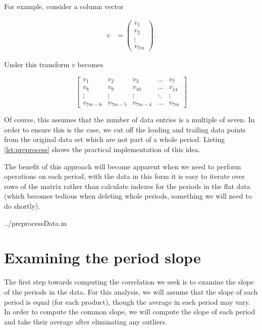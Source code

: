 For example, consider a column vector 

\begin{align}
   v &= \begin{pmatrix}
           v_{1} \\
           v_{2} \\
           \vdots \\
           v_{7m}
         \end{pmatrix}.
  \end{align}

Under this transform $v$ becomes

\[
\begin{bmatrix}
    v_{1} & v_{2} & v_{3} & \dots  & v_{7} \\
    v_{8} & v_{9} & v_{10} & \dots  & v_{14} \\
    \vdots & \vdots & \vdots & \ddots & \vdots \\
    v_{7m-6} & v_{7m-5} & v_{7m -4} & \dots  & v_{7m}
\end{bmatrix}
\]

Of course, this assumes that the number of data entries is a multiple of seven. In order to ensure this is the case, we cut off the leading and trailing data points from the original data set which are not part of a whole period. Listing \ref{lst:preprocess} shows the practical implementation of this idea.

The benefit of this approach will become apparent when we need to perform operations on each period, with the data in this form it is easy to iterate over rows of the matrix rather than calculate indexes for the periods in the flat data (which becomes tedious when deleting whole periods, something we will need to do shortly).

  {../preprocessData.m}

\section{Examining the period slope}

The first step towards computing the correlation we seek is to examine the slope of the periods in the data. For this analysis, we will assume that the slope of each period is equal (for each product), though the average in each period may vary. In order to compute the common slope, we will compute the slope of each period and take their average after eliminating any outliers.

